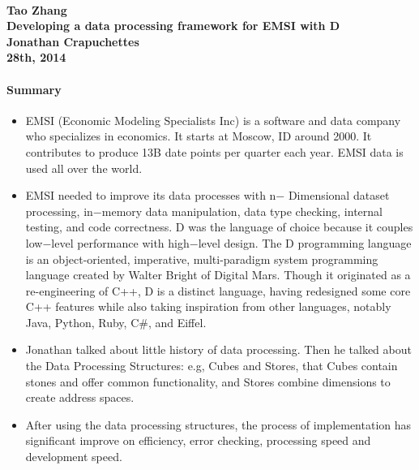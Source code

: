 \documentclass[12pt]{article}
\begin{document}
\paragraph{Tao Zhang\\Developing a data processing framework for EMSI with D\\Jonathan Crapuchettes\\28th, 2014}

\paragraph{Summary}

\begin{itemize}
\item EMSI (Economic Modeling Specialists Inc) is a software and data company who specializes in economics. It starts at Moscow, ID around 2000. It contributes to produce 13B date points per quarter each year. EMSI data is used all over the world.
\item EMSI needed to improve its data processes with n$-$ Dimensional dataset processing, in$-$memory data manipulation, data type checking, internal testing, and code correctness. D was the language of choice because it couples low$-$level performance with high$-$level design. The D programming language is an object-oriented, imperative, multi-paradigm system programming language created by Walter Bright of Digital Mars. Though it originated as a re-engineering of C++, D is a distinct language, having redesigned some core C++ features while also taking inspiration from other languages, notably Java, Python, Ruby, C\#, and Eiffel.
\item Jonathan talked about little history of data processing. Then he talked about the Data Processing Structures: e.g, Cubes and Stores, that Cubes contain stones and offer common functionality, and Stores combine dimensions to create address spaces. 
\item After using the data processing structures, the process of implementation has significant improve on efficiency, error checking, processing speed and development speed. 

\end{itemize}
\end{document}
